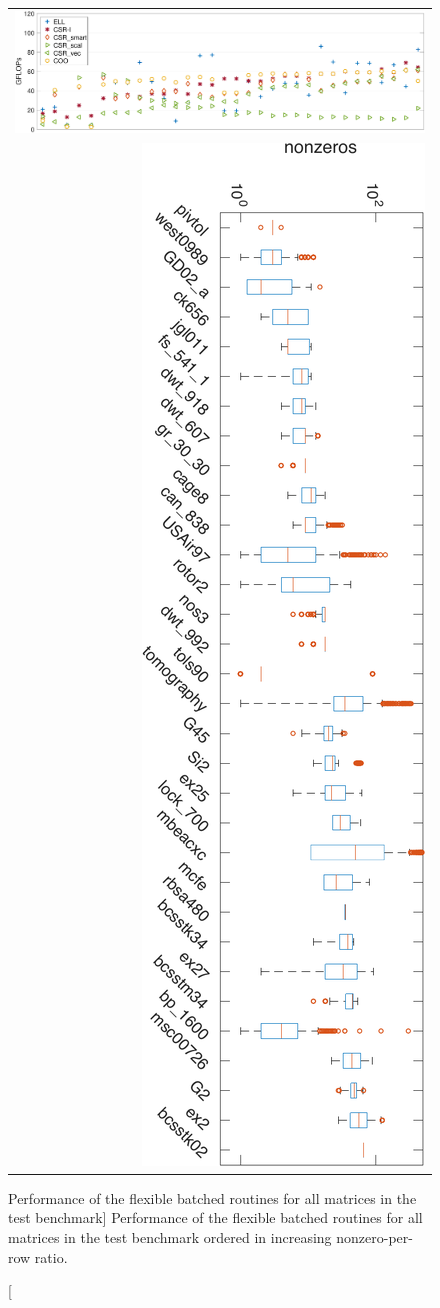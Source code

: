 \begin{figure}[t]
	\begin{center}
		\begin{tabular}{r}
			\includegraphics[width=0.9\columnwidth]{plots/SPARSE_GFLOPS}\\
			\includegraphics[width=.2527\columnwidth,angle=90]
                {plots/nnz_distribution_new}
		\end{tabular}
	\end{center}
	\caption
    [Performance of the flexible batched \spmv routines for all matrices in the
    test benchmark]
    {Performance of the flexible batched \spmv routines for all matrices in 
		the test 
		benchmark
		ordered in increasing nonzero-per-row ratio.
	}
	\label{2017-batched-spmv:fig:allmatricesperf}
\end{figure}


